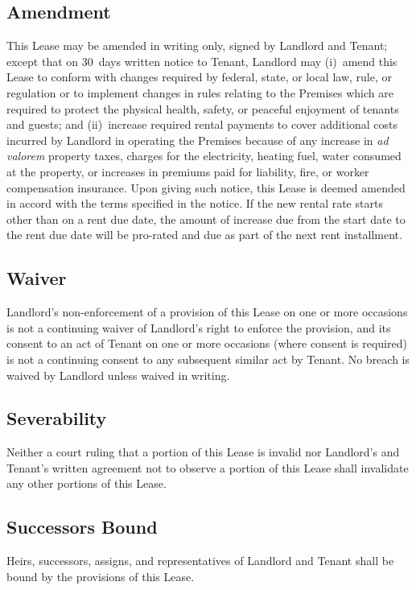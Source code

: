 \documentclass{article}
\begin{document}
\subsection{Amendment}
This Lease may be amended in writing only, signed by Landlord and Tenant; except
that on 30~days written notice to Tenant, Landlord may (i)~amend this Lease to
conform with changes required by federal, state, or local law, rule, or
regulation or to implement changes in rules relating to the Premises which are
required to protect the physical health, safety, or peaceful enjoyment of
tenants and guests; and (ii)~increase required rental payments to cover
additional costs incurred by Landlord in operating the Premises because of any
increase in \textit{ad valorem} property taxes, charges for the electricity,
heating fuel, water consumed at the property, or increases in premiums paid for
liability, fire, or worker compensation insurance. Upon giving such notice, this
Lease is deemed amended in accord with the terms specified in the notice. If the
new rental rate starts other than on a rent due date, the amount of increase due
from the start date to the rent due date will be pro-rated and due as part of
the next rent installment.

\subsection{Waiver}
Landlord’s non-enforcement of a provision of this Lease on one or more occasions
is not a continuing waiver of Landlord’s right to enforce the provision, and its
consent to an act of Tenant on one or more occasions (where consent is required)
is not a continuing consent to any subsequent similar act by Tenant. No breach
is waived by Landlord unless waived in writing.

\subsection{Severability}
Neither a court ruling that a portion of this Lease is invalid nor Landlord’s
and Tenant’s written agreement not to observe a portion of this Lease shall
invalidate any other portions of this Lease.

\subsection{Successors Bound}
Heirs, successors, assigns, and representatives of Landlord and Tenant shall be
bound by the provisions of this Lease.
\end{document}
